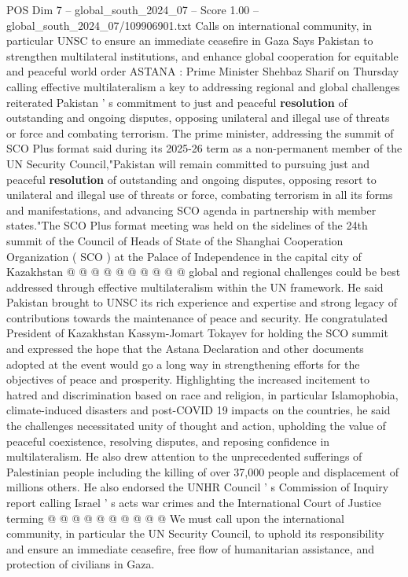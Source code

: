 \begin{textsample}{POS Dim 7 – global\_south\_2024\_07 – Score 1.00 – global\_south\_2024\_07/109906901.txt}  \label{ex:f7_pos_115}
Calls on international community, in particular UNSC to ensure an immediate ceasefire in Gaza Says Pakistan to strengthen multilateral institutions, and enhance global cooperation for equitable and peaceful world order ASTANA : Prime Minister Shehbaz Sharif on Thursday calling effective multilateralism a key to addressing regional and global challenges reiterated Pakistan ' s commitment to just and peaceful \textbf{resolution} of outstanding and ongoing disputes, opposing unilateral and illegal use of threats or force and combating terrorism.
The prime minister, addressing the summit of SCO Plus format said during its 2025-26 term as a non-permanent member of the UN Security Council,"Pakistan will remain committed to pursuing just and peaceful \textbf{resolution} of outstanding and ongoing disputes, opposing resort to unilateral and illegal use of threats or force, combating terrorism in all its forms and manifestations, and advancing SCO agenda in partnership with member states."The SCO Plus format meeting was held on the sidelines of the 24th summit of the Council of Heads of State of the Shanghai Cooperation Organization ( SCO ) at the Palace of Independence in the capital city of Kazakhstan @ @ @ @ @ @ @ @ @ @ global and regional challenges could be best addressed through effective multilateralism within the UN framework.
He said Pakistan brought to UNSC its rich experience and expertise and strong legacy of contributions towards the maintenance of peace and security.
He congratulated President of Kazakhstan Kassym-Jomart Tokayev for holding the SCO summit and expressed the hope that the Astana Declaration and other documents adopted at the event would go a long way in strengthening efforts for the objectives of peace and prosperity.
Highlighting the increased incitement to hatred and discrimination based on race and religion, in particular Islamophobia, climate-induced disasters and post-COVID 19 impacts on the countries, he said the challenges necessitated unity of thought and action, upholding the value of peaceful coexistence, resolving disputes, and reposing confidence in multilateralism.
He also drew attention to the unprecedented sufferings of Palestinian people including the killing of over 37,000 people and displacement of millions others.
He also endorsed the UNHR Council ' s Commission of Inquiry report calling Israel ' s acts war crimes and the International Court of Justice terming @ @ @ @ @ @ @ @ @ @ We must call upon the international community, in particular the UN Security Council, to uphold its responsibility and ensure an immediate ceasefire, free flow of humanitarian assistance, and protection of civilians in Gaza.

\end{textsample}
